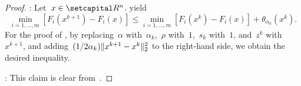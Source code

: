 \documentclass[../../main]{subfiles}
\begin{document}
\begin{proof}
    :
    Let~$x \in \setR^n$.
     yield
    \begin{equation}
        \min_{i = 1, \dots, m} \left[F_i\left(x^{k + 1}\right) - F_i(x)\right] \le \min_{i = 1, \dots, m} \left[F_i\left(x^k\right) - F_i(x)\right] + \theta_{\alpha_k}\left(x^k\right)
        .\end{equation}
    For the proof of , by replacing~$\alpha$ with~$\alpha_k$,~$\rho$ with~$1$,~$s_k$ with~$1$, and~$z^k$ with~$x^{k + 1}$, and adding~$(1 / 2 \alpha_k) \lVert x^{k + 1} - x^k\rVert_2^2$ to the right-hand side, we obtain the desired inequality.

    :
    This claim is clear from~.
\end{proof}
\end{document}

